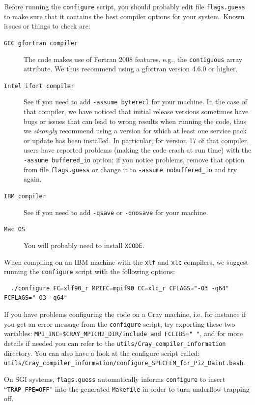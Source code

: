 Before running the \texttt{configure} script, you should probably edit file \texttt{flags.guess} to make sure that it contains the best compiler options for your system. Known issues or things to check are:
\begin{description}
\item [{\texttt{GCC gfortran compiler}}] The code makes use of Fortran 2008 features, e.g., the \texttt{contiguous} array attribute. We thus recommend using a gfortran version 4.6.0 or higher.
\item [{\texttt{Intel ifort compiler}}] See if you need to add \texttt{-assume byterecl} for your machine. In the case of that compiler, we have noticed that initial release versions sometimes have bugs or issues that can lead to wrong results when running the code, thus we \emph{strongly} recommend using a version for which at least one service pack or update has been installed.
In particular, for version 17 of that compiler, users have reported problems (making the code crash at run time) with the \texttt{-assume buffered\_io} option; if you notice problems,
remove that option from file \texttt{flags.guess} or change it to \texttt{-assume nobuffered\_io} and try again.
\item [{\texttt{IBM compiler}}] See if you need to add \texttt{-qsave} or \texttt{-qnosave} for your machine.
\item [{\texttt{Mac OS}}] You will probably need to install \texttt{XCODE}.
\end{description}


When compiling on an IBM machine with the \texttt{xlf} and \texttt{xlc} compilers, we suggest running the \texttt{configure} script
with the following options:
{\small
\begin{verbatim}
  ./configure FC=xlf90_r MPIFC=mpif90 CC=xlc_r CFLAGS="-O3 -q64" FCFLAGS="-O3 -q64"
\end{verbatim}
}


If you have problems configuring the code on a Cray machine, i.e. for instance if you get an error message from the \texttt{configure} script, try exporting these two variables:
\texttt{MPI\_INC=\${CRAY\_MPICH2\_DIR}/include and FCLIBS=" "}, and for more details if needed you can refer to the \texttt{utils/Cray\_compiler\_information} directory.
You can also have a look at the configure script called:\newline
\texttt{utils/Cray\_compiler\_information/configure\_SPECFEM\_for\_Piz\_Daint.bash}.


On SGI systems, \texttt{flags.guess} automatically informs \texttt{configure}
to insert ``\texttt{TRAP\_FPE=OFF}'' into the generated \texttt{Makefile}
in order to turn underflow trapping off.\newline


